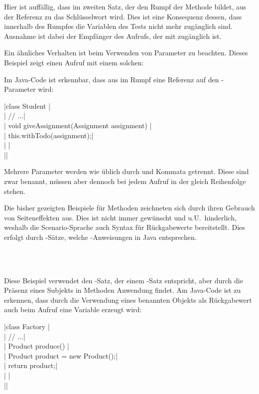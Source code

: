 Hier ist auffällig, dass im zweiten Satz, der den Rumpf der Methode bildet,
aus der Referenz zu  das Schlüsselwort  wird.
Dies ist eine Konsequenz dessen, dass innerhalb des Rumpfes die Variablen des Tests nicht mehr zugänglich sind.
Ausnahme ist dabei der Empfänger des Aufrufs, der mit  zugänglich ist.

Ein ähnliches Verhalten ist beim Verwenden von Parameter zu beachten.
Dieses Beispiel zeigt einen Aufruf mit einem solchen:


Im Java-Code ist erkennbar, dass aus  im Rumpf eine Referenz auf den -Parameter wird:


\jcode|class Student {|\\
\jcode|    // ...|\\
\jcode|    void giveAssignment(Assignment assignment) {|\\
\jcode|        this.withTodo(assignment);|\\
\jcode|    }|\\
\jcode|}|

Mehrere Parameter werden wie üblich durch  und Kommata getrennt.
Diese sind zwar benannt, müssen aber dennoch bei jedem Aufruf in der gleich Reihenfolge stehen.

Die bisher gezeigten Beispiele für Methoden zeichneten sich durch ihren Gebrauch von Seiteneffekten aus.
Dies ist nicht immer gewünscht und u.U.\ hinderlich, weshalb die Scenario-Sprache auch Syntax für Rückgabewerte bereitstellt.
Dies erfolgt durch -Sätze, welche -Anweisungen in Java entsprechen.

\\
\\

Diese Beispiel verwendet den -Satz, der einem -Satz entspricht, aber durch die Präsenz eines Subjekts in Methoden Anwendung findet.
Am Java-Code ist zu erkennen, dass durch die Verwendung eines benannten Objekts als Rückgabewert auch beim Aufruf eine Variable erzeugt wird:


\jcode|class Factory {|\\
\jcode|    // ...|\\
\jcode|    Product produce() {|\\
\jcode|        Product product = new Product();|\\
\jcode|        return product;|\\
\jcode|    }|\\
\jcode|}|

